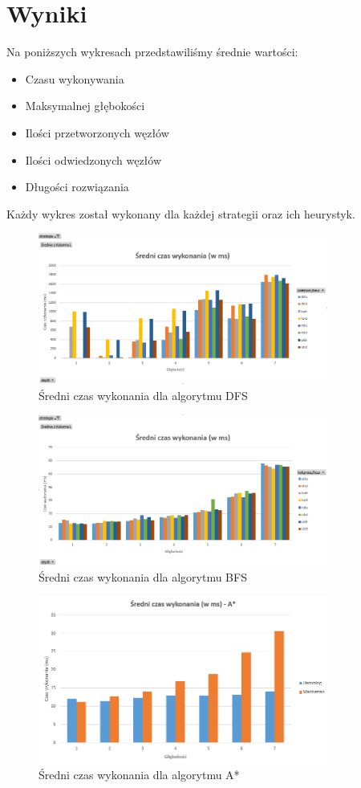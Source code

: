 \documentclass{classrep}
\begin{document}
\section{Wyniki}
Na poniższych wykresach przedstawiliśmy średnie wartości:
\begin{itemize}
\item Czasu wykonywania
\item Maksymalnej głębokości
\item Ilości przetworzonych węzłów
\item Ilości odwiedzonych węzłów
\item Długości rozwiązania
\end{itemize}
Każdy wykres został wykonany dla każdej strategii oraz ich heurystyk.

\begin{figure}[h!]
    \centering
    \includegraphics[width=0.85\textwidth]{czasdfs.png}
    \caption{Średni czas wykonania dla algorytmu DFS}
	\label{czasdfs}
\end{figure}
\begin{figure}[h!]
    \centering
    \includegraphics[width=0.85\textwidth]{czasbfs.png}
    \caption{Średni czas wykonania dla algorytmu BFS}
	\label{czasbfs}
\end{figure}
\begin{figure}[h!]
    \centering
    \includegraphics[width=0.85\textwidth]{czasastr.png}
    \caption{Średni czas wykonania dla algorytmu A*}
	\label{czasastr}
\end{figure}
\end{document}
